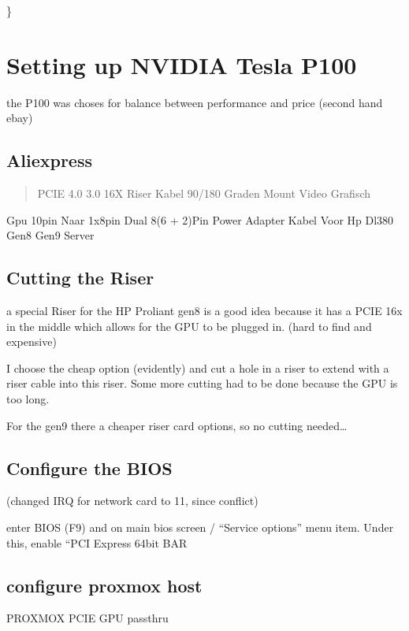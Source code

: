 \documentclass[letterpaper,10pt,english]{sphinxmanual}
\begin{document}
\sphinxAtStartPar
\}

\sphinxstepscope


\chapter{Setting up NVIDIA Tesla P100}
\label{\detokenize{NVIDIA:setting-up-nvidia-tesla-p100}}\label{\detokenize{NVIDIA::doc}}
\sphinxAtStartPar
the P100 was choses for balance between performance and price (second hand ebay)


\section{Aliexpress}
\label{\detokenize{NVIDIA:aliexpress}}\begin{quote}

\sphinxAtStartPar
PCIE 4.0 3.0 16X Riser Kabel 90/180 Graden Mount Video Grafisch
\end{quote}

\sphinxAtStartPar
Gpu 10pin Naar 1x8pin Dual 8(6 + 2)Pin Power Adapter Kabel Voor Hp Dl380 Gen8 Gen9 Server


\section{Cutting the Riser}
\label{\detokenize{NVIDIA:cutting-the-riser}}
\sphinxAtStartPar
a special Riser for the HP Proliant gen8 is a good idea because it has a PCIE 16x in the middle which allows for the GPU  to be plugged in. (hard to find and expensive)

\sphinxAtStartPar
I choose the cheap option (evidently) and cut a hole in a riser to extend with a riser cable into this riser. Some more cutting had to be done because the GPU is too long.

\sphinxAtStartPar
For the gen9 there a cheaper riser card options, so no cutting needed…


\section{Configure the BIOS}
\label{\detokenize{NVIDIA:configure-the-bios}}
\sphinxAtStartPar
(changed IRQ for network card to 11, since conflict)

\sphinxAtStartPar
enter BIOS (F9) and on main bios screen / “Service options” menu item. Under this, enable “PCI Express 64\sphinxhyphen{}bit BAR


\section{configure proxmox host}
\label{\detokenize{NVIDIA:configure-proxmox-host}}
\sphinxAtStartPar
PROXMOX PCI\sphinxhyphen{}E GPU passthru
\end{document}
